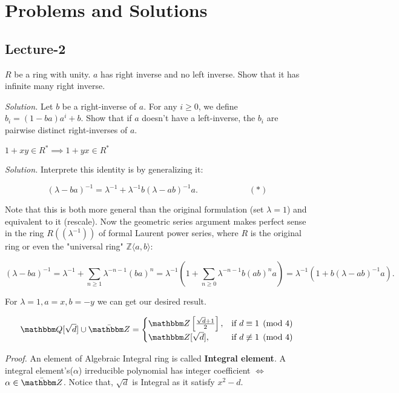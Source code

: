 \documentclass[lec]{subfiles}
\begin{document}
\chapter*{Problems and Solutions} %
\setcounter{chapter}{2} %
\setcounter{section}{0}
\section{Lecture-2}

\begin{tcolorbox}
$R$ be a ring with unity. $a$ has right inverse and no left inverse. Show that it has infinite many right inverse.
\end{tcolorbox}
\textit{Solution.} Let $b$ be a right-inverse of $a$. For any $i \geq 0$, we define $b_i = (1-ba)a^i + b$. Show that if $a$ doesn't have a left-inverse, the $b_i$ are pairwise distinct right-inverses of $a$. 

\begin{tcolorbox}
    $1+xy \in R^* \implies 1 +yx \in R^*$
\end{tcolorbox}
\textit{Solution.}  Interprete this identity is by generalizing it:

$$(\lambda-ba)^{-1}=\lambda^{-1}+\lambda^{-1}b(\lambda-ab)^{-1}a.\qquad\qquad\qquad(*)$$

Note that this is both more general than the original formulation (set $\lambda=1$) and equivalent to it (rescale). Now the geometric series argument makes perfect sense in the ring $R((\lambda^{-1}))$ of formal Laurent power series, where $R$ is the original ring or even the "universal ring" $\mathbb{Z}\langle a,b\rangle:$

$$ (\lambda-ba)^{-1}=\lambda^{-1}+\sum_{n\geq 1}\lambda^{-n-1}(ba)^n=\lambda^{-1}(1+\sum_{n\geq 0}\lambda^{-n-1}b(ab)^n a)=\lambda^{-1}(1+b(\lambda-ab)^{-1}a). $$

For $\lambda = 1 , a = x, b = -y$ we can get our desired result. 

\begin{tcolorbox}
    \[
    \Q[\sqrt{d}] \cup \bar{\Z}= 
\begin{cases}
    \Z\left[\frac{\sqrt{d}+1}{2}\right],& \text{if } d \equiv 1 \pmod{4}\\
    \Z[\sqrt{d}],              & \text{if } d \not \equiv 1 \pmod{4}
\end{cases}
\]
\end{tcolorbox}
\textit{Proof.} An element of Algebraic Integral ring is called \textbf{Integral element}. A integral element's($\alpha$) irreducible polynomial has integer coefficient $\iff$ $\alpha \in \bar{\Z}$. Notice that, $\sqrt{d}$ is Integral as it satisfy $x^2-d$.
\end{document}
